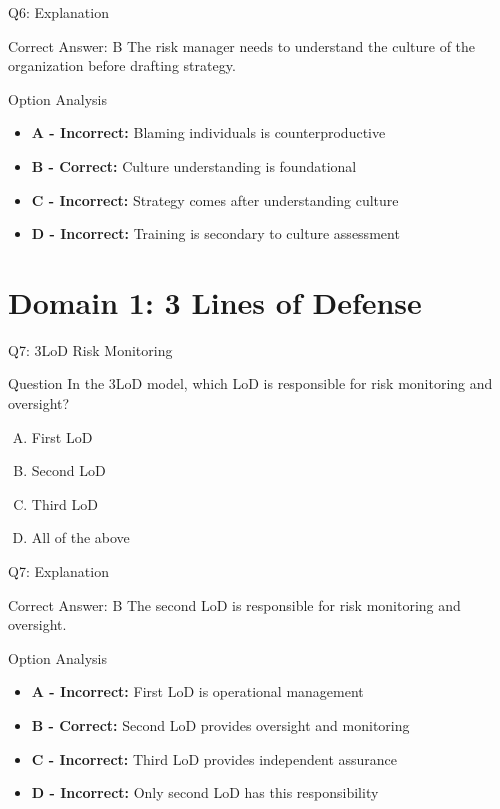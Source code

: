 \documentclass{beamer}
\begin{document}
	\begin{frame}{Q6: Explanation}
		\begin{block}{Correct Answer: B}
			The risk manager needs to understand the culture of the organization before drafting strategy.
		\end{block}
		\begin{block}{Option Analysis}
			\begin{itemize}
				\item \textbf{A - Incorrect:} Blaming individuals is counterproductive
				\item \textbf{B - Correct:} Culture understanding is foundational
				\item \textbf{C - Incorrect:} Strategy comes after understanding culture
				\item \textbf{D - Incorrect:} Training is secondary to culture assessment
			\end{itemize}
		\end{block}
	\end{frame}
	
	\section{Domain 1: 3 Lines of Defense}
	
	\begin{frame}{Q7: 3LoD Risk Monitoring}
		\begin{block}{Question}
			In the 3LoD model, which LoD is responsible for risk monitoring and oversight?
		\end{block}
		\begin{enumerate}[(A)]
			\item First LoD
			\item Second LoD
			\item Third LoD
			\item All of the above
		\end{enumerate}
	\end{frame}
	
	\begin{frame}{Q7: Explanation}
		\begin{block}{Correct Answer: B}
			The second LoD is responsible for risk monitoring and oversight.
		\end{block}
		\begin{block}{Option Analysis}
			\begin{itemize}
				\item \textbf{A - Incorrect:} First LoD is operational management
				\item \textbf{B - Correct:} Second LoD provides oversight and monitoring
				\item \textbf{C - Incorrect:} Third LoD provides independent assurance
				\item \textbf{D - Incorrect:} Only second LoD has this responsibility
			\end{itemize}
		\end{block}
	\end{frame}
	
\end{document}
